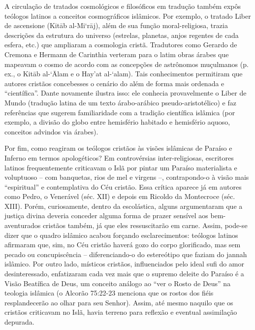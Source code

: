 A circulação de tratados cosmológicos e filosóficos em tradução também expôs teólogos latinos a conceitos cosmográficos islâmicos. Por exemplo, o tratado Liber de ascensione (Kitāb al-Mi‘rāj), além de sua função moral-religiosa, trazia descrições da estrutura do universo (estrelas, planetas, anjos regentes de cada esfera, etc.) que ampliaram a cosmologia cristã. Tradutores como Gerardo de Cremona e Hermann de Carinthia verteram para o latim obras árabes que mapeavam o cosmo de acordo com as concepções de astrônomos muçulmanos (p. ex., o Kitāb al-‘Ālam e o Hay’at al-‘alam). Tais conhecimentos permitiram que autores cristãos concebesses o cenário do além de forma mais ordenada e “científica”. Dante novamente ilustra isso: ele conhecia provavelmente o Liber de Mundo (tradução latina de um texto árabo-arábico pseudo-aristotélico) e faz referências que sugerem familiaridade com a tradição científica islâmica (por exemplo, a divisão do globo entre hemisfério habitado e hemisfério aquoso, conceitos advindos via árabes).

Por fim, como reagiram os teólogos cristãos às visões islâmicas de Paraíso e Inferno em termos apologéticos? Em controvérsias inter-religiosas, escritores latinos frequentemente criticavam o Islã por pintar um Paraíso materialista e voluptuoso -- com banquetas, rios de mel e virgens --, contrapondo-o à visão mais “espiritual” e contemplativa do Céu cristão. Essa crítica aparece já em autores como Pedro, o Venerável (séc. XII) e depois em Ricoldo da Montecroce (séc. XIII). Porém, curiosamente, dentro da escolástica, alguns argumentaram que a justiça divina deveria conceder alguma forma de prazer sensível aos bem-aventurados cristãos também, já que eles ressuscitarão em carne. Assim, pode-se dizer que o quadro islâmico acabou forçando esclarecimentos: teólogos latinos afirmaram que, sim, no Céu cristão haverá gozo do corpo glorificado, mas sem pecado ou concupiscência -- diferenciando-o do estereótipo que faziam do jannah islâmico. Por outro lado, místicos cristãos, influenciados pelo ideal sufi do amor desinteressado, enfatizaram cada vez mais que o supremo deleite do Paraíso é a Visão Beatífica de Deus, um conceito análogo ao “ver o Rosto de Deus” na teologia islâmica (o Alcorão 75:22-23 menciona que os rostos dos fiéis resplandecerão ao olhar para seu Senhor). Assim, até mesmo naquilo que os cristãos criticavam no Islã, havia terreno para reflexão e eventual assimilação depurada.

